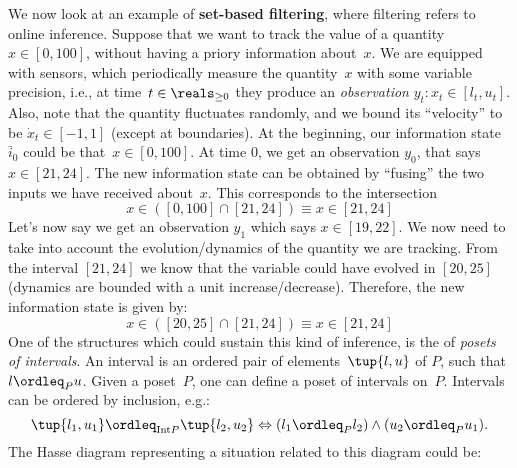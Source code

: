 \begin{example}
  We now look at an example of \textbf{set-based filtering}, where filtering refers to online inference.
  Suppose that we want to track the value of a quantity~$x\in [0,100]$, without having a priory information about~$x$.
  We are equipped with sensors, which periodically measure the quantity~$x$ with some variable precision, i.e., at time~$t\in \reals_{\geq 0}$ they produce an \emph{observation} $y_t\colon x_t\in [l_t,u_t]$.
  Also, note that the quantity fluctuates randomly, and we bound its ``velocity'' to be $\dot{x}_t\in [-1,1]$ (except at boundaries).
  At the beginning, our information state $\bar{i}_0$ could be that~$x\in [0,100]$.
  At time 0, we get an observation $y_0$, that says $x\in [21,24]$.
  The new information state can be obtained by ``fusing'' the two inputs we have received about~$x$. This corresponds to the intersection
  \begin{equation*}
    x\in \left( [0,100] \cap [21,24]\right)\equiv x\in [21,24]
  \end{equation*}
  Let's now say we get an observation $y_1$ which says $x\in [19,22]$.
  We now need to take into account the evolution/dynamics of the quantity we are tracking. From the interval $[21,24]$ we know that the variable could have evolved in $[20,25]$ (dynamics are bounded with a unit increase/decrease). Therefore, the new information state is given by:
  \begin{equation*}
    x\in \left( [20,25] \cap [21,24]\right)\equiv x\in [21,24]
  \end{equation*}
  One of the structures which could sustain this kind of inference, is the of \emph{posets of intervals}.
  An interval is an ordered pair of elements~$\tup{l,u}$ of $P$, such that $l\ordleq_P u$.
  Given a poset~$P$, one can define a poset of intervals on~$P$. Intervals can be ordered by inclusion, e.g.:
  \begin{equation*}
    \tup{l_1,u_1}\ordleq_{\mathrm{Int} P}\tup{l_2,u_2} \Leftrightarrow (l_1\ordleq_P l_2)\wedge (u_2\ordleq_P u_1).
  \end{equation*}
  The Hasse diagram representing a situation related to this diagram could be:
  \begin{center}
  \end{center}
\end{example}

